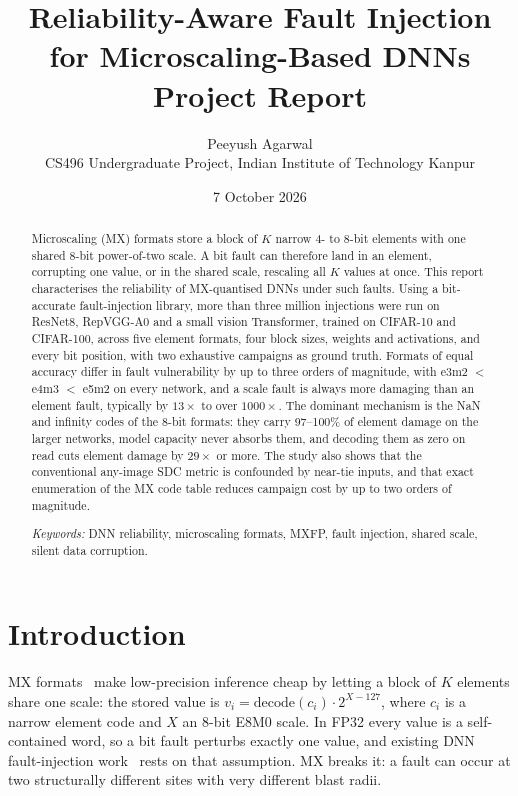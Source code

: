 \documentclass[10pt,a4paper]{article}
\title{\textbf{Reliability-Aware Fault Injection\\for Microscaling-Based DNNs}\\[6pt]
\large Project Report}
\author{Peeyush Agarwal\\[2pt]
\small CS496 Undergraduate Project, Indian Institute of Technology Kanpur}
\date{7 October 2026}
\begin{document}
\maketitle

\begin{abstract}
\noindent Microscaling (MX) formats store a block of $K$ narrow 4- to 8-bit elements with one
shared 8-bit power-of-two scale. A bit fault can therefore land in an element, corrupting one
value, or in the shared scale, rescaling all $K$ values at once. This report characterises the
reliability of MX-quantised DNNs under such faults. Using a bit-accurate fault-injection library,
more than three million injections were run on ResNet8, RepVGG-A0 and a small vision
Transformer, trained on CIFAR-10 and CIFAR-100, across five element formats, four block sizes,
weights and activations, and every bit position, with two exhaustive campaigns as ground truth.
Formats of equal accuracy differ in fault vulnerability by up to three orders of magnitude, with
e3m2 $<$ e4m3 $<$ e5m2 on every network, and a scale fault is always more damaging than an
element fault, typically by $13\times$ to over $1000\times$. The dominant mechanism is the NaN
and infinity codes of the 8-bit formats: they carry 97--100\% of element damage on the larger
networks, model capacity never absorbs them, and decoding them as zero on read cuts element
damage by $29\times$ or more. The study also shows that the conventional any-image SDC metric is
confounded by near-tie inputs, and that exact enumeration of the MX code table reduces campaign
cost by up to two orders of magnitude.

\medskip
\noindent\textit{Keywords:} DNN reliability, microscaling formats, MXFP, fault injection,
shared scale, silent data corruption.
\end{abstract}

\section{Introduction}

MX formats~\cite{rouhani2023mx,ocp2023mx} make low-precision inference cheap by letting a block
of $K$ elements share one scale: the stored value is $v_i=\mathrm{decode}(c_i)\cdot2^{X-127}$,
where $c_i$ is a narrow element code and $X$ an 8-bit E8M0 scale. In FP32 every value is a
self-contained word, so a bit fault perturbs exactly one value, and existing DNN fault-injection
work~\cite{li2017understanding,reagen2018ares,mahmoud2020pytorchfi} rests on that assumption. MX
breaks it: a fault can occur at two structurally different sites with very different blast
radii.
\end{document}
